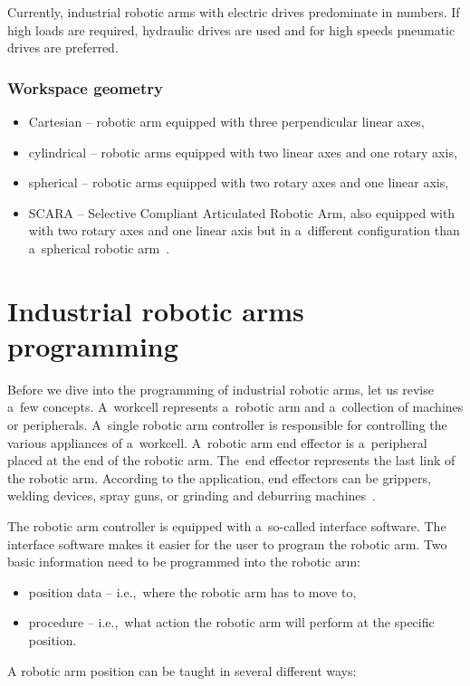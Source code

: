 Currently, industrial robotic arms with electric drives predominate in numbers. If high loads are required, hydraulic drives are used and for high speeds pneumatic drives are preferred.

\subsubsection*{Workspace geometry}

\begin{itemize}
    \item Cartesian -- robotic arm equipped with three perpendicular linear axes,
    \item cylindrical -- robotic arms equipped with two linear axes and one rotary axis,
    \item spherical --  robotic arms equipped with two rotary axes and one linear axis,
    \item SCARA -- Selective Compliant Articulated Robotic Arm, also equipped with with two rotary axes and one linear axis but in a~different configuration than a~spherical robotic arm~\cite{vsb_2007}.
\end{itemize}

\section{Industrial robotic arms programming}

Before we dive into the programming of industrial robotic arms, let us revise a~few concepts. A~workcell represents a~robotic arm and a~collection of machines or peripherals. A~single robotic arm controller is responsible for controlling the various appliances of a~workcell. A~robotic arm end effector is a~peripheral placed at the end of the robotic arm. The~end effector represents the last link of the robotic arm. According to the application, end effectors can be grippers, welding devices, spray guns, or grinding and deburring machines~\cite{monkman_2007}.

The robotic arm controller is equipped with a~so-called interface software. The interface software makes it easier for the user to program the robotic arm. Two basic information need to be programmed into the robotic arm:

\begin{itemize}
    \item position data -- i.e.,~where the robotic arm has to move to,
    \item procedure -- i.e.,~what action the robotic arm will perform at the specific position.
\end{itemize}
A robotic arm position can be taught in several different ways:

